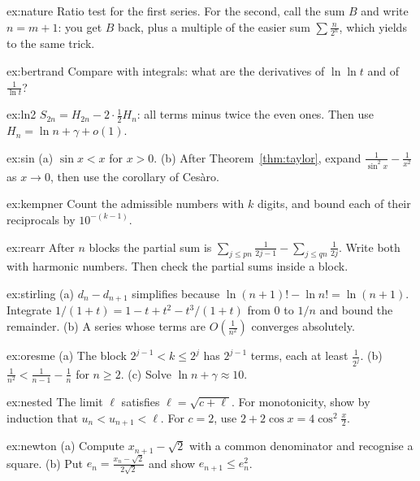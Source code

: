 \begin{hint}{ex:nature}
Ratio test for the first series. For the second, call the sum $B$ and write $n=m+1$: you get $B$ back, plus a multiple of the easier sum $\sum\frac n{2^n}$, which yields to the same trick.
\end{hint}
\begin{hint}{ex:bertrand}
Compare with integrals: what are the derivatives of $\ln\ln t$ and of $\frac1{\ln t}$?
\end{hint}
\begin{hint}{ex:ln2}
$S_{2n}=H_{2n}-2\cdot\frac12H_n$: all terms minus twice the even ones. Then use $H_n=\ln n+\gamma+o(1)$.
\end{hint}
\begin{hint}{ex:sin}
(a) $\sin x<x$ for $x>0$. (b) After Theorem~\ref{thm:taylor}, expand $\frac1{\sin^2x}-\frac1{x^2}$ as $x\to0$, then use the corollary of Ces\`aro.
\end{hint}
\begin{hint}{ex:kempner}
Count the admissible numbers with $k$ digits, and bound each of their reciprocals by $10^{-(k-1)}$.
\end{hint}
\begin{hint}{ex:rearr}
After $n$ blocks the partial sum is $\sum_{j\le pn}\frac1{2j-1}-\sum_{j\le qn}\frac1{2j}$. Write both with harmonic numbers. Then check the partial sums inside a block.
\end{hint}
\begin{hint}{ex:stirling}
(a) $d_n-d_{n+1}$ simplifies because $\ln(n+1)!-\ln n!=\ln(n+1)$.
Integrate $1/(1+t)=1-t+t^2-t^3/(1+t)$ from $0$ to $1/n$ and bound the remainder. (b) A series whose terms are $O\left(\frac1{n^2}\right)$ converges absolutely.
\end{hint}
\begin{hint}{ex:oresme}
(a) The block $2^{j-1}<k\le2^j$ has $2^{j-1}$ terms, each at least $\frac1{2^j}$. (b) $\frac1{n^2}<\frac1{n-1}-\frac1n$ for $n\ge2$. (c) Solve $\ln n+\gamma\approx10$.
\end{hint}
\begin{hint}{ex:nested}
The limit $\ell$ satisfies $\ell=\sqrt{c+\ell}$. For monotonicity, show by induction that $u_n<u_{n+1}<\ell$. For $c=2$, use $2+2\cos x=4\cos^2\frac x2$.
\end{hint}
\begin{hint}{ex:newton}
(a) Compute $x_{n+1}-\sqrt2$ with a common denominator and recognise a square. (b) Put $e_n=\frac{x_n-\sqrt2}{2\sqrt2}$ and show $e_{n+1}\le e_n^2$.
\end{hint}
